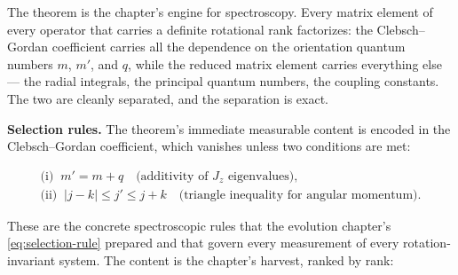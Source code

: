 The theorem is the chapter's engine for spectroscopy. Every matrix element of every operator that carries a definite rotational rank factorizes: the Clebsch--Gordan coefficient carries all the dependence on the orientation quantum numbers $m$, $m'$, and $q$, while the reduced matrix element carries everything else --- the radial integrals, the principal quantum numbers, the coupling constants. The two are cleanly separated, and the separation is exact.

\medskip\noindent\textbf{Selection rules.} The theorem's immediate measurable content is encoded in the Clebsch--Gordan coefficient, which vanishes unless two conditions are met:
\begin{linenomath}
\begin{equation}
\boxed{\;
\begin{array}{l}
\text{(i)}\;\; m' = m + q \quad\text{(additivity of $J_z$ eigenvalues)}, \\[4pt]
\text{(ii)}\;\; |j-k| \le j' \le j+k \quad\text{(triangle inequality for angular momentum)} .
\end{array}
\;}
\label{eq:wigner-eckart-selection}
\end{equation}
\end{linenomath}
These are the concrete spectroscopic rules that the evolution chapter's \eqref{eq:selection-rule} prepared and that govern every measurement of every rotation-invariant system. The content is the chapter's harvest, ranked by rank:

